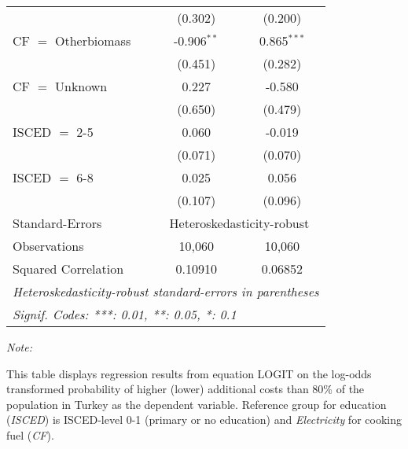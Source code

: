 \begin{table}[htbp!]
\begin{adjustbox}{width = 1\textwidth, max height = 0.95\textheight, center}
\begin{threeparttable}[b]
\begin{tabular}{lcc}
                                 & (0.302)        & (0.200)\\   
            CF $=$ Otherbiomass  & -0.906$^{**}$  & 0.865$^{***}$\\   
                                 & (0.451)        & (0.282)\\   
            CF $=$ Unknown       & 0.227          & -0.580\\   
                                 & (0.650)        & (0.479)\\   
            ISCED $=$ 2-5        & 0.060          & -0.019\\   
                                 & (0.071)        & (0.070)\\   
            ISCED $=$ 6-8        & 0.025          & 0.056\\   
                                 & (0.107)        & (0.096)\\   
            \midrule 
            Standard-Errors & \multicolumn{2}{c}{Heteroskedasticity-robust} \\ 
            Observations         & 10,060         & 10,060\\  
            Squared Correlation  & 0.10910        & 0.06852\\  
            \midrule \midrule
            \multicolumn{3}{l}{\emph{Heteroskedasticity-robust standard-errors in parentheses}}\\
            \multicolumn{3}{l}{\emph{Signif. Codes: ***: 0.01, **: 0.05, *: 0.1}}\\
         \end{tabular}
         
         \begin{tablenotes}\item \medskip \textit{Note:}
            \item This table displays regression results from equation LOGIT on the log-odds transformed probability of higher (lower) additional costs than 80\% of the population in Turkey as the dependent variable. Reference group for education (\textit{ISCED}) is ISCED-level 0-1 (primary or no education) and \textit{Electricity} for cooking fuel (\textit{CF}).
         \end{tablenotes}
      \end{threeparttable}
   \end{adjustbox}
\end{table}


